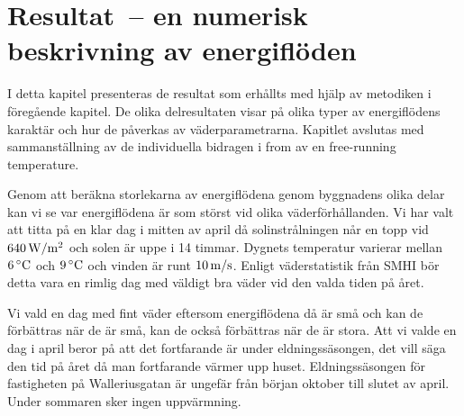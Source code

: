 \chapter{Resultat – en numerisk beskrivning av energiflöden}

I detta kapitel presenteras de resultat som erhållts med hjälp av metodiken i föregående kapitel. De olika delresultaten visar på olika typer av energiflödens karaktär och hur de påverkas av väderparametrarna. Kapitlet avslutas med sammanställning av de individuella bidragen i from av en free-running temperature.

Genom att beräkna storlekarna av energiflödena genom byggnadens olika delar kan vi se var energiflödena är som störst vid olika väderförhållanden. Vi har valt att titta på en klar dag i mitten av april då solinstrålningen når en topp vid $\unit[640]{W/m^2}$ och solen är uppe i 14 timmar. Dygnets temperatur varierar mellan $\unit[6]{^\circ C}$ och $\unit[9]{^\circ C}$ och vinden är runt $\unit[10]{m/s}$. Enligt väderstatistik från SMHI\cite{SMHIdata} bör detta vara en rimlig dag med väldigt bra väder vid den valda tiden på året.

Vi vald en dag med fint väder eftersom energiflödena då är små och kan de förbättras när de är små, kan de också förbättras när de är stora. Att vi valde en dag i april beror på att det fortfarande är under eldningssäsongen, det vill säga den tid på året då man fortfarande värmer upp huset. Eldningssäsongen för fastigheten på Walleriusgatan är ungefär från början oktober till slutet av april. Under sommaren sker ingen uppvärmning.













